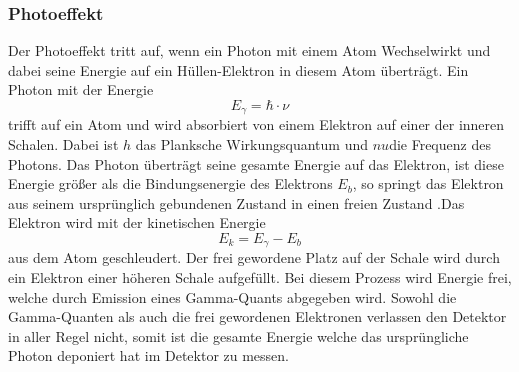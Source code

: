 \subsubsection{Photoeffekt}
Der Photoeffekt tritt auf, wenn ein Photon mit einem Atom Wechselwirkt und dabei seine Energie auf ein Hüllen-Elektron in diesem Atom 
überträgt. Ein Photon mit der Energie 
\begin{equation}
     E_{\gamma} = \hbar \cdot \nu 
\end{equation} 
trifft auf ein Atom und wird absorbiert von einem Elektron auf einer der inneren Schalen.
Dabei ist \( h \) das Planksche Wirkungsquantum und \(nu \)die Frequenz des Photons.
Das Photon überträgt seine gesamte Energie auf das Elektron, ist diese Energie größer als die Bindungsenergie des Elektrons $E_b$, so springt das 
Elektron aus seinem ursprünglich gebundenen Zustand in einen freien Zustand .Das Elektron wird mit der kinetischen Energie 
\begin{equation}
    E_k=E_{\gamma}-E_b 
\end{equation} 
aus dem Atom geschleudert. Der frei gewordene Platz auf der Schale wird durch ein Elektron einer höheren Schale aufgefüllt. Bei diesem Prozess wird Energie frei, 
welche durch Emission eines Gamma-Quants abgegeben wird. Sowohl die Gamma-Quanten als auch die frei gewordenen Elektronen verlassen den Detektor in aller Regel nicht,
somit ist die gesamte Energie welche das ursprüngliche Photon deponiert hat im Detektor zu messen.
\cite{Strahlung_Arten}

